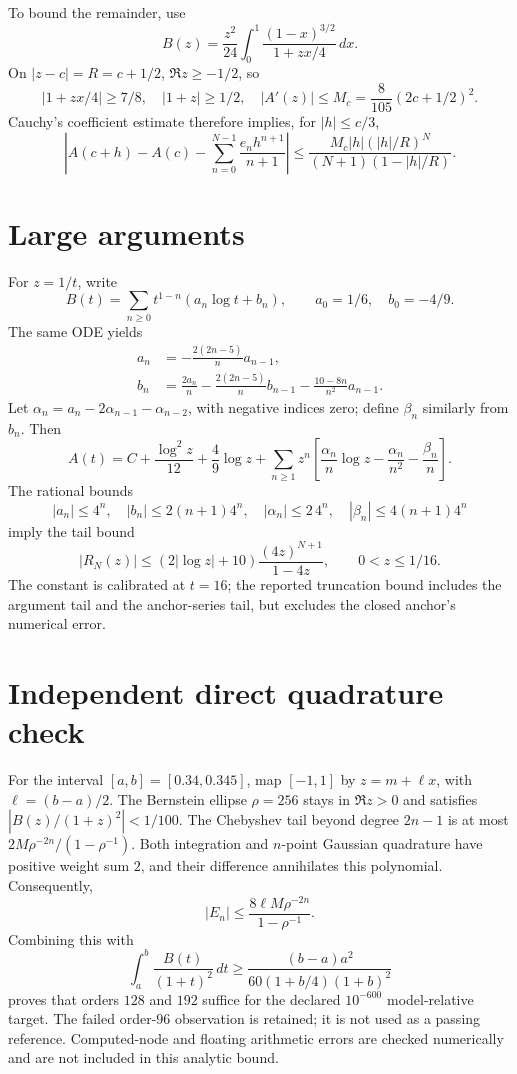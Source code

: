\documentclass[11pt]{article}
\begin{document}
To bound the remainder, use
\[
 B(z)=\frac{z^2}{24}\int_0^1
 \frac{(1-x)^{3/2}}{1+zx/4}\,dx .
\]
On \(|z-c|=R=c+1/2\), \(\Re z\geq-1/2\), so
\[
 |1+zx/4|\geq7/8,\quad |1+z|\geq1/2,\quad
 |A'(z)|\leq M_c=\frac8{105}(2c+1/2)^2.
\]
Cauchy's coefficient estimate therefore implies, for \(|h|\leq c/3\),
\[
 \left|A(c+h)-A(c)-\sum_{n=0}^{N-1}
 \frac{e_nh^{n+1}}{n+1}\right|
 \leq \frac{M_c|h|(|h|/R)^N}{(N+1)(1-|h|/R)}.
\]

\section{Large arguments}
For \(z=1/t\), write
\[
 B(t)=\sum_{n\geq0}t^{1-n}(a_n\log t+b_n),\qquad
 a_0=1/6,\quad b_0=-4/9.
\]
The same ODE yields
\begin{align*}
 a_n&=-\frac{2(2n-5)}n a_{n-1},\\
 b_n&=\frac{2a_n}n-\frac{2(2n-5)}n b_{n-1}
                -\frac{10-8n}{n^2}a_{n-1}.
\end{align*}
Let \(\alpha_n=a_n-2\alpha_{n-1}-\alpha_{n-2}\), with negative
indices zero; define \(\beta_n\) similarly from \(b_n\). Then
\[
 A(t)=C+\frac{\log^2z}{12}+\frac49\log z+
 \sum_{n\geq1}z^n\left[
 \frac{\alpha_n}{n}\log z-\frac{\alpha_n}{n^2}-\frac{\beta_n}{n}\right].
\]
The rational bounds
\[
 |a_n|\leq4^n,\quad |b_n|\leq2(n+1)4^n,\quad
 |\alpha_n|\leq2\,4^n,\quad |\beta_n|\leq4(n+1)4^n
\]
imply the tail bound
\[
 |R_N(z)|\leq
 (2|\log z|+10)\frac{(4z)^{N+1}}{1-4z},\qquad 0<z\leq1/16.
\]
The constant is calibrated at \(t=16\); the reported truncation bound
includes the argument tail and the anchor-series tail, but excludes the
closed anchor's numerical error.

\section{Independent direct quadrature check}
For the interval \([a,b]=[0.34,0.345]\), map \([-1,1]\) by
\(z=m+\ell x\), with \(\ell=(b-a)/2\). The Bernstein ellipse
\(\rho=256\) stays in \(\Re z>0\) and satisfies
\(|B(z)/(1+z)^2|<1/100\).
The Chebyshev tail beyond degree \(2n-1\) is at most
\(2M\rho^{-2n}/(1-\rho^{-1})\).
Both integration and \(n\)-point Gaussian quadrature have positive
weight sum \(2\), and their difference annihilates this polynomial.
Consequently,
\[
 |E_n|\leq\frac{8\ell M\rho^{-2n}}{1-\rho^{-1}}.
\]
Combining this with
\[
 \int_a^b\frac{B(t)}{(1+t)^2}\,dt
 \geq\frac{(b-a)a^2}{60(1+b/4)(1+b)^2}
\]
proves that orders \(128\) and \(192\) suffice for the declared
\(10^{-600}\) model-relative target.
The failed order-\(96\) observation is retained; it is not used as a
passing reference. Computed-node and floating arithmetic errors are
checked numerically and are not included in this analytic bound.
\end{document}
